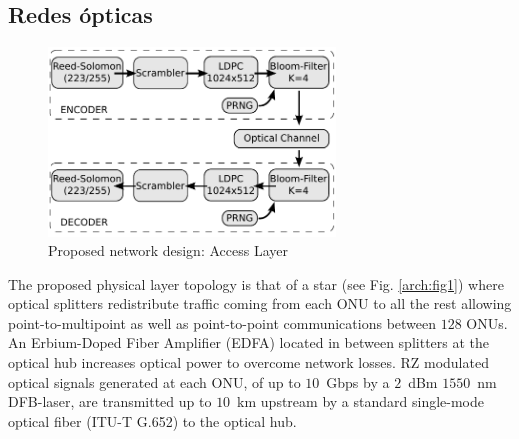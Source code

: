 \subsection{Redes ópticas}
\begin{figure}[!t]
  \centering
    \includegraphics[width=3in]{orte01.pdf}
    \caption{Proposed network design: Access Layer}
    \label{arch:chain}
\end{figure}

The proposed physical layer topology is that of a star (see Fig.
\ref{arch:fig1}) where optical splitters redistribute traffic coming
from each ONU to all the rest allowing point-to-multipoint as well as
point-to-point communications between $128$ ONUs.
An Erbium-Doped Fiber Amplifier (EDFA) located in between splitters at
the optical hub increases optical power to overcome network losses.  RZ
modulated optical signals generated at each ONU, of up to $10$~Gbps by a
$2$~dBm $1550$~nm DFB-laser, are transmitted up to $10$~km upstream by a
standard single-mode optical fiber (ITU-T G.652) to the optical hub.

